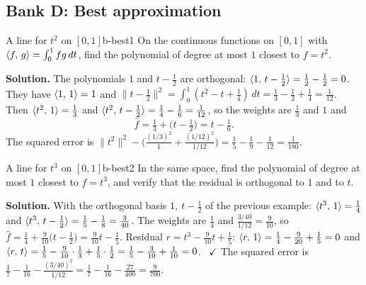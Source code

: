 \documentclass[11pt]{article}
\begin{document}
\subsection*{Bank D: Best approximation}
\begin{exmp}{A line for $t^2$ on $[0,1]$}{b-best1}
On the continuous functions on $[0,1]$ with $\langle f,\,g\rangle=\int_0^1fg\,dt$, find the polynomial of degree at most $1$ closest to $f=t^2$.

\textbf{Solution.} The polynomials $1$ and $t-\tfrac12$ are orthogonal: $\langle 1,\,t-\tfrac12\rangle=\tfrac12-\tfrac12=0$. They have $\langle 1,\,1\rangle=1$ and $\lVert t-\tfrac12\rVert^2=\int_0^1(t^2-t+\tfrac14)\,dt=\tfrac13-\tfrac12+\tfrac14=\tfrac1{12}$. Then $\langle t^2,\,1\rangle=\tfrac13$ and $\langle t^2,\,t-\tfrac12\rangle=\tfrac14-\tfrac16=\tfrac1{12}$, so the weights are $\tfrac13$ and $1$ and
\[
\hat f=\tfrac13+\bigl(t-\tfrac12\bigr)=t-\tfrac16 .
\]
The squared error is $\lVert t^2\rVert^2-\bigl(\tfrac{(1/3)^2}{1}+\tfrac{(1/12)^2}{1/12}\bigr)=\tfrac15-\tfrac19-\tfrac1{12}=\tfrac1{180}$.
\end{exmp}

\begin{exmp}{A line for $t^3$ on $[0,1]$}{b-best2}
In the same space, find the polynomial of degree at most $1$ closest to $f=t^3$, and verify that the residual is orthogonal to $1$ and to $t$.

\textbf{Solution.} With the orthogonal basis $1,\ t-\tfrac12$ of the previous example: $\langle t^3,\,1\rangle=\tfrac14$ and $\langle t^3,\,t-\tfrac12\rangle=\tfrac15-\tfrac18=\tfrac3{40}$. The weights are $\tfrac14$ and $\tfrac{3/40}{1/12}=\tfrac9{10}$, so $\hat f=\tfrac14+\tfrac9{10}\bigl(t-\tfrac12\bigr)=\tfrac9{10}t-\tfrac15$. Residual $r=t^3-\tfrac9{10}t+\tfrac15$: $\langle r,\,1\rangle=\tfrac14-\tfrac9{20}+\tfrac15=0$ and $\langle r,\,t\rangle=\tfrac15-\tfrac9{10}\cdot\tfrac13+\tfrac15\cdot\tfrac12=\tfrac15-\tfrac3{10}+\tfrac1{10}=0$. \ $\checkmark$ The squared error is $\tfrac17-\tfrac1{16}-\tfrac{(3/40)^2}{1/12}=\tfrac17-\tfrac1{16}-\tfrac{27}{400}=\tfrac9{700}$.
\end{exmp}
\end{document}

